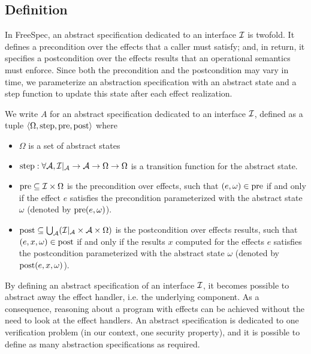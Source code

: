 \subsection{Definition}

In FreeSpec, an abstract specification dedicated to an interface $\mathcal{I}$ is
twofold.
%
It defines a precondition over the effects that a caller must satisfy; and, in
return, it specifies a postcondition over the effects results that an
operational semantics must enforce.
%
Since both the precondition and the postcondition may vary in time, we
parameterize an abstraction specification with an abstract state and a step
function to update this state after each effect realization.

\begin{definition} \label{def:freespec:abstract-specs}
  We write $A$ for an abstract specification dedicated to an interface $\mathcal{I}$,
  defined as a tuple
  $\langle \Omega, \mathrm{step}, \mathrm{pre}, \mathrm{post} \rangle$ where
  \begin{itemize}
  \item $\Omega$ is a set of abstract states
  \item
    $\mathrm{step} : \forall \mathcal{A}, \mathcal{I}|_{\mathcal{A}} \rightarrow
    \mathcal{A} \rightarrow \Omega \rightarrow \Omega$ is a transition function
    for the abstract state.
  \item $\mathrm{pre} \subseteq \mathcal{I} \times \Omega$ is the precondition over
    effects, such that $(e, \omega) \in \mathrm{pre}$ if and only if the effect
    $e$ satisfies the precondition parameterized with the abstract state
    $\omega$ (denoted by $\mathrm{pre}(e, \omega)$).
  \item
    $\mathrm{post} \subseteq \bigcup_{\mathcal{A}} (\mathcal{I}|_{\mathcal{A}}
    \times \mathcal{A} \times \Omega)$ is the postcondition over effects
    results, such that $(e, x, \omega) \in \mathrm{post}$ if and only if the
    results $x$ computed for the effects $e$ satisfies the postcondition
    parameterized with the abstract state $\omega$ (denoted by
    $\mathrm{post}(e, x, \omega)$).
  \end{itemize}
\end{definition}

By defining an abstract specification of an interface $\mathcal{I}$, it becomes possible
to abstract away the effect handler, i.e. the underlying component.
%
As a consequence, reasoning about a program with effects can be achieved without
the need to look at the effect handlers.
%
An abstract specification is dedicated to one verification problem (in our
context, one security property), and it is possible to define as many
abstraction specifications as required.

